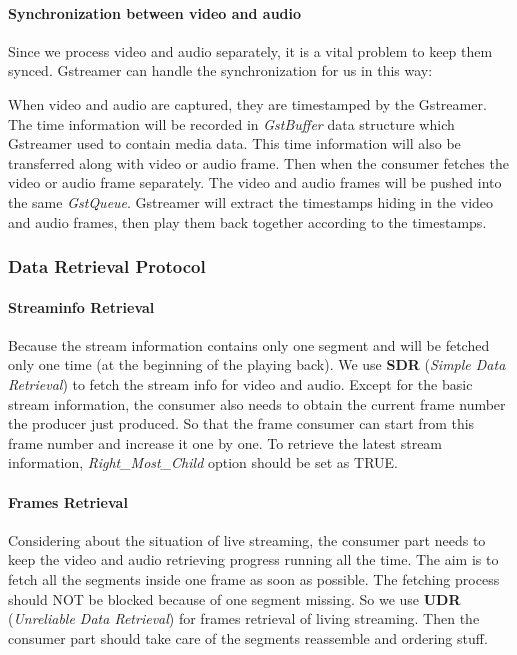 \paragraph {Synchronization between video and audio}
\label{par:sync}
Since we process video and audio separately, it is a vital problem to keep them synced. Gstreamer can handle the synchronization for us in this way:

When video and audio are captured, they are timestamped by the Gstreamer. The time information will be recorded in \textit{GstBuffer} data structure which Gstreamer used to contain media data. This time information will also be transferred along with video or audio frame. Then when the consumer fetches the video or audio frame separately. The video and audio frames will be pushed into the same \textit{GstQueue}. Gstreamer will extract the timestamps hiding in the video and audio frames, then play them back together according to the timestamps.

\subsubsection{Data Retrieval Protocol}
\paragraph{Streaminfo Retrieval} %
\label{par:streaminfo}
Because the stream information contains only one segment and will be fetched only one time (at the beginning of the playing back). We use \textbf{SDR} (\textit{Simple Data Retrieval}) to fetch the stream info for video and audio. Except for the basic stream information, the consumer also needs to obtain the current frame number the producer just produced. So that the frame consumer can start from this frame number and increase it one by one. To retrieve the latest stream information, \textit{Right\_Most\_Child} option should be set as TRUE.
\paragraph{Frames Retrieval} 
Considering about the situation of live streaming, the consumer part needs to keep the video and audio retrieving progress running all the time. The aim is to fetch all the segments inside one frame as soon as possible. The fetching process should NOT be blocked because of one segment missing. So we use \textbf{UDR} (\textit{Unreliable Data Retrieval}) for frames retrieval of living streaming. Then the consumer part should take care of the segments reassemble and ordering stuff.

